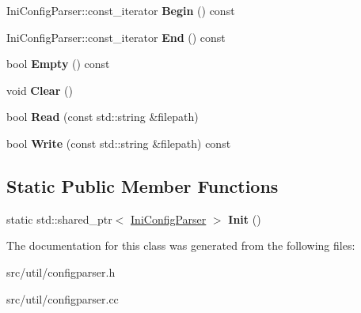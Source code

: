 \begin{DoxyCompactItemize}
\item 
Ini\+Config\+Parser\+::const\+\_\+iterator {\bfseries Begin} () const \hypertarget{classlog2hdfs_1_1IniConfigParser_ab1c7cf51560f0e4b7172defa1900b948}{}\label{classlog2hdfs_1_1IniConfigParser_ab1c7cf51560f0e4b7172defa1900b948}

\item 
Ini\+Config\+Parser\+::const\+\_\+iterator {\bfseries End} () const \hypertarget{classlog2hdfs_1_1IniConfigParser_a5ab4ebd42acd0993db74c55d60468ae7}{}\label{classlog2hdfs_1_1IniConfigParser_a5ab4ebd42acd0993db74c55d60468ae7}

\item 
bool {\bfseries Empty} () const \hypertarget{classlog2hdfs_1_1IniConfigParser_a489246260e96bcd7b714d7873b298a6a}{}\label{classlog2hdfs_1_1IniConfigParser_a489246260e96bcd7b714d7873b298a6a}

\item 
void {\bfseries Clear} ()\hypertarget{classlog2hdfs_1_1IniConfigParser_a3a322d4842c048c51e9e31ec817ac29c}{}\label{classlog2hdfs_1_1IniConfigParser_a3a322d4842c048c51e9e31ec817ac29c}

\item 
bool {\bfseries Read} (const std\+::string \&filepath)\hypertarget{classlog2hdfs_1_1IniConfigParser_a3863dfedd40a884fa7b7dc7db718e88d}{}\label{classlog2hdfs_1_1IniConfigParser_a3863dfedd40a884fa7b7dc7db718e88d}

\item 
bool {\bfseries Write} (const std\+::string \&filepath) const \hypertarget{classlog2hdfs_1_1IniConfigParser_a0a145c323b3fff62e405645c88f78b6c}{}\label{classlog2hdfs_1_1IniConfigParser_a0a145c323b3fff62e405645c88f78b6c}

\end{DoxyCompactItemize}
\subsection*{Static Public Member Functions}
\begin{DoxyCompactItemize}
\item 
static std\+::shared\+\_\+ptr$<$ \hyperlink{classlog2hdfs_1_1IniConfigParser}{Ini\+Config\+Parser} $>$ {\bfseries Init} ()\hypertarget{classlog2hdfs_1_1IniConfigParser_a78747e0d07c0789a29941b4e284ac6b8}{}\label{classlog2hdfs_1_1IniConfigParser_a78747e0d07c0789a29941b4e284ac6b8}

\end{DoxyCompactItemize}


The documentation for this class was generated from the following files\+:\begin{DoxyCompactItemize}
\item 
src/util/configparser.\+h\item 
src/util/configparser.\+cc\end{DoxyCompactItemize}
